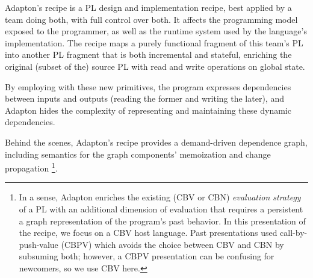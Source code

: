 \documentclass[11pt]{article}
\begin{document}
\noindent
Adapton's recipe is a PL design and implementation recipe, best
applied by a team doing both, with full control over both.
%
It affects the programming model exposed to the programmer, as well as
the runtime system used by the language's implementation.
%
The recipe maps a purely functional fragment of this team's PL into
another PL fragment that is both incremental and stateful, enriching
the original (subset of the) source PL with read and write operations
on global state.


\begin{center}
\end{center}

\noindent
By employing with these new primitives, the program expresses dependencies
between inputs and outputs (reading the former and writing the later),
and Adapton hides the complexity of representing and maintaining these
dynamic dependencies.

Behind the scenes, Adapton's recipe provides a demand-driven
dependence graph, including semantics for the graph components'
memoization and change propagation
\footnote{
In a sense, Adapton enriches the existing (CBV or CBN)
\emph{evaluation strategy} of a PL with an additional dimension of
evaluation that requires a persistent a graph representation of the
program's past behavior.
%
In this presentation of the recipe, we focus on a CBV host language.
%
Past presentations used call-by-push-value (CBPV) which avoids the
choice between CBV and CBN by subsuming both; however, a CBPV
presentation can be confusing for newcomers, so we use CBV here.
}.
\end{document}
